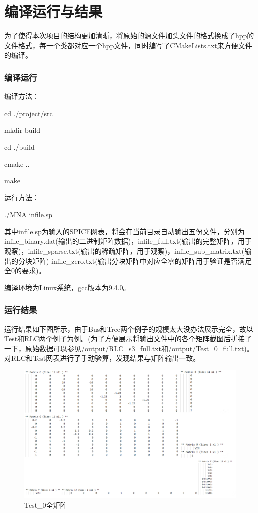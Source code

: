 \documentclass[12pt]{article}
\begin{document}
\section{编译运行与结果}

\qquad 为了使得本次项目的结构更加清晰，将原始的源文件加头文件的格式换成了hpp的文件格式，每一个类都对应一个hpp文件，同时编写了CMakeLists.txt来方便文件的编译。\par
\subsubsection{编译运行}
\qquad 编译方法：\par
\qquad cd ./project/src\par
\qquad mkdir build\par
\qquad cd ./build\par
\qquad cmake ..\par
\qquad make\par
\qquad 运行方法：\par
\qquad ./MNA infile.sp \par
\qquad 其中infile.sp为输入的SPICE网表，将会在当前目录自动输出五份文件，分别为infile\_binary.dat(输出的二进制矩阵数据)，infile\_full.txt(输出的完整矩阵，用于观察)，infile\_sparse.txt(输出的稀疏矩阵，用于观察)，infile\_sub\_matrix.txt(输出的分块矩阵) infile\_zero.txt(输出分块矩阵中对应全零的矩阵用于验证是否满足全0的要求)。\par
\qquad 编译环境为Linux系统，gcc版本为9.4.0。\par

\subsubsection{运行结果}

\qquad 运行结果如下图所示，由于Bus和Tree两个例子的规模太大没办法展示完全，故以Test和RLC两个例子为例。(为了方便展示将输出文件中的各个矩阵截图后拼接了一下，原始数据可以参见/output/RLC\_s3\_full.txt和/output/Test\_0\_full.txt)。对RLC和Test网表进行了手动验算，发现结果与矩阵输出一致。\par
\qquad \par
\begin{figure}[H]
  \centering
  \includegraphics[width=15cm]{figure/Test_full.png}
  \caption{Test\_0全矩阵}
\end{figure}
\end{document}
